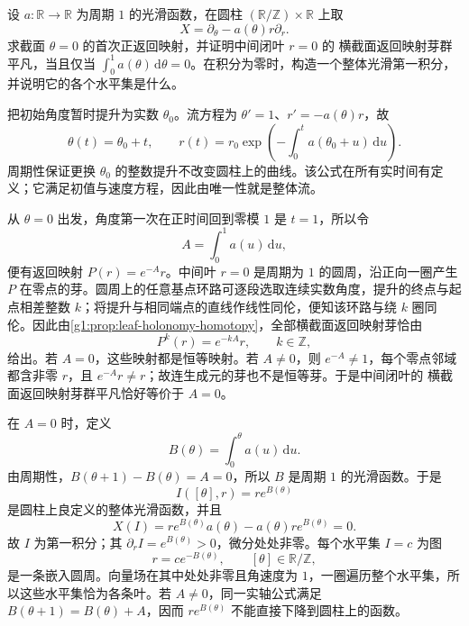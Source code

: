 \begin{exercise}
	\label{g1:exr:1305-variable-cylinder-holonomy}
	设 \(a:\mathbb R\to\mathbb R\) 为周期 \(1\) 的光滑函数，在圆柱 \((\mathbb R/\mathbb Z)\times\mathbb R\) 上取
	\[
		X=\partial_\theta-a(\theta)r\partial_r.
	\]
	求截面 \(\theta=0\) 的首次正返回映射，并证明中间闭叶 \(r=0\) 的 横截面返回映射芽群平凡，当且仅当 \(\int_0^1a(\theta)\,\mathrm{d}\theta=0\)。在积分为零时，构造一个整体光滑第一积分，并说明它的各个水平集是什么。
\end{exercise}
\begin{solution}
	把初始角度暂时提升为实数 \(\theta_0\)。流方程为 \(\theta'=1\)、\(r'=-a(\theta)r\)，故
	\[
		\theta(t)=\theta_0+t,\qquad
		r(t)=r_0\exp\left(-\int_0^t a(\theta_0+u)\,\mathrm{d}u\right).
	\]
	周期性保证更换 \(\theta_0\) 的整数提升不改变圆柱上的曲线。该公式在所有实时间有定义；它满足初值与速度方程，因此由唯一性就是整体流。

	从 \(\theta=0\) 出发，角度第一次在正时间回到零模 \(1\) 是 \(t=1\)，所以令
	\[
		A=\int_0^1a(u)\,\mathrm{d}u,
	\]
	便有返回映射 \(P(r)=e^{-A}r\)。中间叶 \(r=0\) 是周期为 \(1\) 的圆周，沿正向一圈产生 \(P\) 在零点的芽。圆周上的任意基点环路可逐段选取连续实数角度，提升的终点与起点相差整数 \(k\)；将提升与相同端点的直线作线性同伦，便知该环路与绕 \(k\) 圈同伦。因此由\cref{g1:prop:leaf-holonomy-homotopy}，全部横截面返回映射芽恰由
	\[
		P^k(r)=e^{-kA}r,\qquad k\in\mathbb Z,
	\]
	给出。若 \(A=0\)，这些映射都是恒等映射。若 \(A\ne0\)，则 \(e^{-A}\ne1\)，每个零点邻域都含非零 \(r\)，且 \(e^{-A}r\ne r\)；故连生成元的芽也不是恒等芽。于是中间闭叶的 横截面返回映射芽群平凡恰好等价于 \(A=0\)。

	在 \(A=0\) 时，定义
	\[
		B(\theta)=\int_0^\theta a(u)\,\mathrm{d}u.
	\]
	由周期性，\(B(\theta+1)-B(\theta)=A=0\)，所以 \(B\) 是周期 \(1\) 的光滑函数。于是
	\[
		I([\theta],r)=r e^{B(\theta)}
	\]
	是圆柱上良定义的整体光滑函数，并且
	\[
		X(I)=r e^{B(\theta)}a(\theta)-a(\theta)r e^{B(\theta)}=0.
	\]
	故 \(I\) 为第一积分；其 \(\partial_r I=e^{B(\theta)}>0\)，微分处处非零。每个水平集 \(I=c\) 为图
	\[
		r=c e^{-B(\theta)},\qquad [\theta]\in\mathbb R/\mathbb Z,
	\]
	是一条嵌入圆周。向量场在其中处处非零且角速度为 \(1\)，一圈遍历整个水平集，所以这些水平集恰为各条叶。若 \(A\ne0\)，同一实轴公式满足 \(B(\theta+1)=B(\theta)+A\)，因而 \(r e^{B(\theta)}\) 不能直接下降到圆柱上的函数。
\end{solution}

